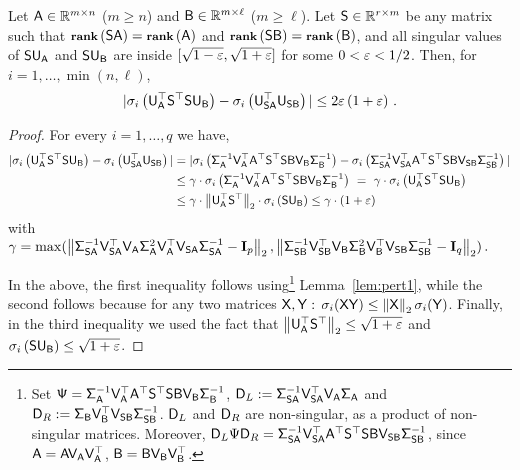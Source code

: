 \begin{lemma}\label{lem:pert5}
Let $\matA \in \R^{m \times n}$ ($m \geq n$) and $\matB \in \R^{m \times \ell}$ ($m \geq \ell$).  Let $\matS \in \R^{r \times m}$ be any matrix such that $\rank{\matS \matA} = \rank{\matA}$ and $\rank{\matS \matB}=\rank{\matB}$, and all singular values of $\matS \matU_{\matA}$ and $\matS \matU_{\matB}$ are inside $[\sqrt{1-\eps},\sqrt{1+\eps}]$ for some
$0 < \eps < 1/2$.
Then, for $i=1,\dots,\min(n,\ell)$,
\[|\sigma_i\left( \matU_{\matA}^\top \matS^\top \matS \matU_{\matB} \right) -   \sigma_i \left( \matU_{\matS\matA}^\top\matU_{\matS \matB} \right) |
\le 2 \eps \left( 1 + \eps \right)\,.\]
\end{lemma}
\begin{proof}
For every $i=1,\ldots,q$ we have,
\begin{align*}
|\sigma_i\left( \matU_{\matA}^\top \matS^\top \matS \matU_{\matB} \right) - \sigma_i \left( \matU_{\matS\matA}^\top\matU_{\matS\matB} \right) |
 & = |\sigma_i\left(  \matSig_{\matA}^{-1} \matV_{\matA}^\top \matA^\top \matS^\top \matS \matB \matV_{\matB} \matSig_{\matB}^{-1}   \right)
 -  \sigma_i \left( \matSig_{\matS\matA}^{-1} \matV_{\matS\matA}^\top \matA^\top \matS^\top \matS \matB \matV_{\matS \matB} \matSig_{\matS \matB}^{-1} \right) | \\
& \leq  \gamma \cdot \sigma_i\left( \matSig_{\matA}^{-1} \matV_{\matA}^\top\matA^\top \matS^\top \matS \matB \matV_{\matB} \matSig_{\matB}^{-1} \right)
\ =\ \gamma \cdot \sigma_i\left( \matU_{\matA}^\top \matS^\top \matS \matU_{\matB} \right) \\
& \leq \gamma \cdot \norm{ \matU_{\matA}^\top \matS^\top } \cdot  \sigma_i\left( \matS \matU_{\matB} \right)
\leq \gamma \cdot  \left( 1 + \eps\right)
\end{align*}
with $ \gamma = \max(
\norm{\matSig_{\matS\matA}^{-1} \matV_{\matS\matA}^\top \matV_{\matA} \matSig_{\matA}^2 \matV_{\matA}^\top \matV_{\matS\matA} \matSig_{\matS\matA}^{-1} - \matI_p}  ,
\norm{\matSig_{\matS\matB}^{-1} \matV_{\matS\matB}^\top \matV_{\matB} \matSig_{\matB}^2 \matV_{\matB}^\top \matV_{\matS\matB} \matSig_{\matS\matB}^{-1} - \matI_q}
)\,.$
%

%
In the above, the first inequality follows using\footnote{Set $\matPsi = \matSig_{\matA}^{-1} \matV_{\matA}^\top \matA^\top \matS^\top \matS \matB \matV_{\matB} \matSig_{\matB}^{-1}$, $\matD_L := \matSig^{-1}_{\matS \matA}\matV_{\matS\matA}^\top \matV_{\matA} \matSig_{\matA}$ and $\matD_R:=\matSig_{\matB}\matV_{\matB}^\top \matV_{\matS\matB} \matSig_{\matS\matB}^{-1}$. $\matD_L$ and $\matD_R$ are non-singular, as a product of non-singular matrices. Moreover, $\matD_L\Psi \matD_R = \matSig_{\matS\matA}^{-1} \matV_{\matS\matA}^\top \matA^\top \matS^\top \matS \matB \matV_{\matS \matB} \matSig_{\matS \matB}^{-1}$, since $\matA = \matA \matV_{\matA}\matV_{\matA}^\top$, $\matB = \matB \matV_{\matB}\matV_{\matB}^\top$. }  Lemma~\ref{lem:pert1}, while the second follows
because for any two matrices $\matX, \matY:$ $\sigma_i(\matX \matY) \le \norm{\matX} \sigma_i(\matY)$.
Finally, in the third inequality we used the fact that $\norm{ \matU_{\matA}^\top \matS^\top } \le \sqrt{1+\eps}$ and $\sigma_i\left( \matS \matU_{\matB} \right) \le \sqrt{1+\eps}$.


\end{proof}
